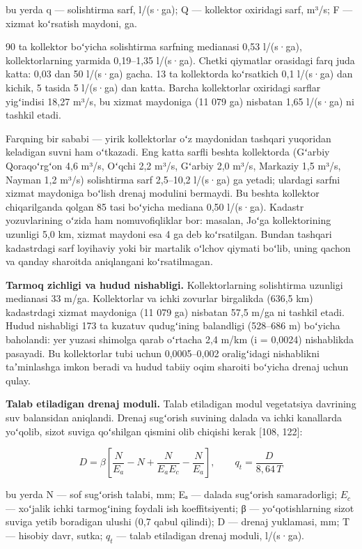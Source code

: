 bu yerda q --- solishtirma sarf, l/(s·ga); Q --- kollektor oxiridagi
sarf, m³/s; F --- xizmat koʻrsatish maydoni, ga.

90 ta kollektor boʻyicha solishtirma sarfning medianasi 0,53 l/(s·ga),
kollektorlarning yarmida 0,19--1,35 l/(s·ga). Chetki qiymatlar orasidagi
farq juda katta: 0,03 dan 50 l/(s·ga) gacha. 13 ta kollektorda
koʻrsatkich 0,1 l/(s·ga) dan kichik, 5 tasida 5 l/(s·ga) dan katta.
Barcha kollektorlar oxiridagi sarflar yigʻindisi 18,27 m³/s, bu xizmat
maydoniga (11 079 ga) nisbatan 1,65 l/(s·ga) ni tashkil etadi.

Farqning bir sababi --- yirik kollektorlar oʻz maydonidan tashqari
yuqoridan keladigan suvni ham oʻtkazadi. Eng katta sarfli beshta
kollektorda (Gʻarbiy Qoraqoʻrgʻon 4,6 m³/s, Oʻqchi 2,2 m³/s, Gʻarbiy 2,0
m³/s, Markaziy 1,5 m³/s, Nayman 1,2 m³/s) solishtirma sarf 2,5--10,2
l/(s·ga) ga yetadi; ulardagi sarfni xizmat maydoniga boʻlish drenaj
modulini bermaydi. Bu beshta kollektor chiqarilganda qolgan 85 tasi
boʻyicha mediana 0,50 l/(s·ga). Kadastr yozuvlarining oʻzida ham
nomuvofiqliklar bor: masalan, Joʻga kollektorining uzunligi 5,0 km,
xizmat maydoni esa 4 ga deb koʻrsatilgan. Bundan tashqari kadastrdagi
sarf loyihaviy yoki bir martalik oʻlchov qiymati boʻlib, uning qachon va
qanday sharoitda aniqlangani koʻrsatilmagan.

\textbf{Tarmoq zichligi va hudud nishabligi.} Kollektorlarning
solishtirma uzunligi medianasi 33 m/ga. Kollektorlar va ichki zovurlar
birgalikda (636,5 km) kadastrdagi xizmat maydoniga (11 079 ga) nisbatan
57,5 m/ga ni tashkil etadi. Hudud nishabligi 173 ta kuzatuv qudugʻining
balandligi (528--686 m) boʻyicha baholandi: yer yuzasi shimolga qarab
oʻrtacha 2,4 m/km (i = 0,0024) nishablikda pasayadi. Bu kollektorlar
tubi uchun 0,0005--0,002 oraligʻidagi nishablikni taʼminlashga imkon
beradi va hudud tabiiy oqim sharoiti boʻyicha drenaj uchun qulay.

\textbf{Talab etiladigan drenaj moduli.} Talab etiladigan modul
vegetatsiya davrining suv balansidan aniqlandi. Drenaj sugʻorish
suvining dalada va ichki kanallarda yoʻqolib, sizot suviga qoʻshilgan
qismini olib chiqishi kerak {[}108, 122{]}:

\begin{equation}\tag{4.2}
D = \beta \left[ \frac{N}{E_a} - N + \frac{N}{E_a E_c} - \frac{N}{E_a} \right], \qquad q_t = \frac{D}{8{,}64 \, T}
\end{equation}

bu yerda N --- sof sugʻorish talabi, mm; Eₐ --- dalada sugʻorish
samaradorligi; \(E_{c}\) --- xoʻjalik ichki tarmogʻining foydali ish
koeffitsiyenti; β --- yoʻqotishlarning sizot suviga yetib boradigan
ulushi (0,7 qabul qilindi); D --- drenaj yuklamasi, mm; T --- hisobiy
davr, sutka; \(q_{t}\) --- talab etiladigan drenaj moduli, l/(s·ga).

